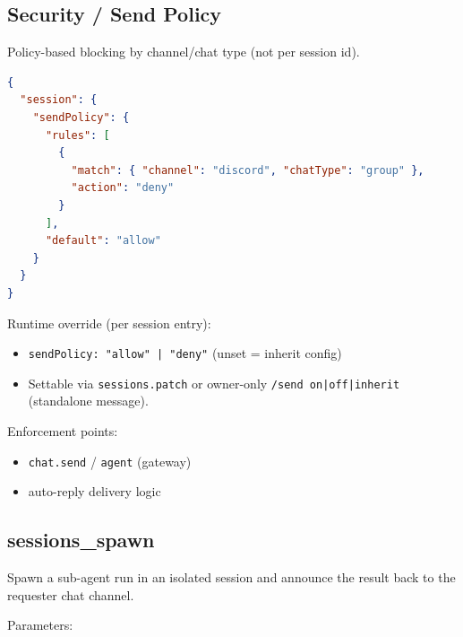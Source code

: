 \subsection{Security / Send Policy}


Policy-based blocking by channel/chat type (not per session id).

\begin{lstlisting}[language=json]
{
  "session": {
    "sendPolicy": {
      "rules": [
        {
          "match": { "channel": "discord", "chatType": "group" },
          "action": "deny"
        }
      ],
      "default": "allow"
    }
  }
}
\end{lstlisting}


Runtime override (per session entry):

\begin{itemize}
  \item \texttt{sendPolicy: "allow" | "deny"} (unset = inherit config)
  \item Settable via \texttt{sessions.patch} or owner-only \texttt{/send on|off|inherit} (standalone message).
\end{itemize}


Enforcement points:

\begin{itemize}
  \item \texttt{chat.send} / \texttt{agent} (gateway)
  \item auto-reply delivery logic
\end{itemize}


\subsection{sessions\_spawn}


Spawn a sub-agent run in an isolated session and announce the result back to the requester chat channel.

Parameters:


